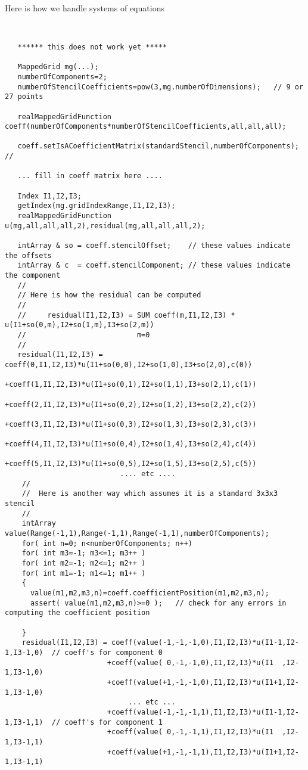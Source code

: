 Here is how we handle systems of equations
{\footnotesize
\begin{verbatim}


   ****** this does not work yet *****

   MappedGrid mg(...);
   numberOfComponents=2;
   numberOfStencilCoefficients=pow(3,mg.numberOfDimensions);   // 9 or 27 points

   realMappedGridFunction coeff(numberOfComponents*numberOfStencilCoefficients,all,all,all);

   coeff.setIsACoefficientMatrix(standardStencil,numberOfComponents);             // 

   ... fill in coeff matrix here ....

   Index I1,I2,I3;
   getIndex(mg.gridIndexRange,I1,I2,I3);
   realMappedGridFunction u(mg,all,all,all,2),residual(mg,all,all,all,2);

   intArray & so = coeff.stencilOffset;    // these values indicate the offsets
   intArray & c  = coeff.stencilComponent; // these values indicate the component
   // 
   // Here is how the residual can be computed
   //
   //     residual(I1,I2,I3) = SUM coeff(m,I1,I2,I3) * u(I1+so(0,m),I2+so(1,m),I3+so(2,m))
   //                          m=0 
   //
   residual(I1,I2,I3) = coeff(0,I1,I2,I3)*u(I1+so(0,0),I2+so(1,0),I3+so(2,0),c(0))
                       +coeff(1,I1,I2,I3)*u(I1+so(0,1),I2+so(1,1),I3+so(2,1),c(1))
                       +coeff(2,I1,I2,I3)*u(I1+so(0,2),I2+so(1,2),I3+so(2,2),c(2))
                       +coeff(3,I1,I2,I3)*u(I1+so(0,3),I2+so(1,3),I3+so(2,3),c(3))
                       +coeff(4,I1,I2,I3)*u(I1+so(0,4),I2+so(1,4),I3+so(2,4),c(4))
                       +coeff(5,I1,I2,I3)*u(I1+so(0,5),I2+so(1,5),I3+so(2,5),c(5))
                           .... etc ....
    // 
    //  Here is another way which assumes it is a standard 3x3x3 stencil
    //
    intArray value(Range(-1,1),Range(-1,1),Range(-1,1),numberOfComponents);
    for( int n=0; n<numberOfComponents; n++)
    for( int m3=-1; m3<=1; m3++ )
    for( int m2=-1; m2<=1; m2++ )
    for( int m1=-1; m1<=1; m1++ )
    {
      value(m1,m2,m3,n)=coeff.coefficientPosition(m1,m2,m3,n);
      assert( value(m1,m2,m3,n)>=0 );   // check for any errors in computing the coefficient position
      
    }
    residual(I1,I2,I3) = coeff(value(-1,-1,-1,0),I1,I2,I3)*u(I1-1,I2-1,I3-1,0)  // coeff's for component 0
                        +coeff(value( 0,-1,-1,0),I1,I2,I3)*u(I1  ,I2-1,I3-1,0)
                        +coeff(value(+1,-1,-1,0),I1,I2,I3)*u(I1+1,I2-1,I3-1,0)
                             ... etc ...
                        +coeff(value(-1,-1,-1,1),I1,I2,I3)*u(I1-1,I2-1,I3-1,1)  // coeff's for component 1
                        +coeff(value( 0,-1,-1,1),I1,I2,I3)*u(I1  ,I2-1,I3-1,1)
                        +coeff(value(+1,-1,-1,1),I1,I2,I3)*u(I1+1,I2-1,I3-1,1)

\end{verbatim}
}

